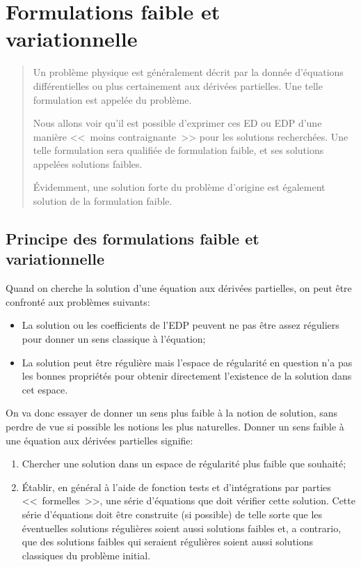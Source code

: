 \chapter{Formulations faible et variationnelle}\label{Ch_FFaible}
\begin{abstract}
Un problème physique est généralement décrit par la donnée
d'équations différentielles ou plus certainement aux dérivées partielles.
Une telle formulation est appelée  du problème.

Nous allons voir qu'il est possible d'exprimer ces ED ou EDP d'une manière
<<~moins contraignante~>> pour les solutions recherchées.
Une telle formulation sera qualifiée de formulation faible, et ses
solutions appelées solutions faibles.

Évidemment, une solution forte du problème d'origine est également solution de
la formulation faible.
\end{abstract}


\medskip
\section{Principe des formulations faible et variationnelle}
Quand on cherche la solution d'une équation aux dérivées partielles, on peut être confronté aux problèmes suivants:
\begin{itemize}
   \item La solution ou les coefficients de l'EDP peuvent ne pas être assez réguliers pour donner
	un sens classique à l'équation;
   \item La solution peut être régulière mais l'espace de régularité en question n'a pas les
	bonnes propriétés pour obtenir directement l'existence de la solution dans cet espace.
\end{itemize}


\medskip



On va donc essayer de donner un sens plus faible à la notion de solution, sans perdre de vue si
possible les notions les plus naturelles. Donner un sens faible à une équation aux dérivées partielles signifie:
\begin{enumerate}
   \item Chercher une solution dans un espace de régularité plus faible que souhaité;
   \item Établir, en général à l'aide de fonction tests et d'intégrations par parties <<~formelles~>>,
	une série d'équations que doit vérifier cette solution.
	Cette série d'équations doit être construite (si possible) de telle sorte que les éventuelles
	solutions régulières soient aussi solutions faibles et, a contrario, que des solutions faibles
	qui seraient régulières soient aussi solutions classiques du problème initial.
\end{enumerate}


